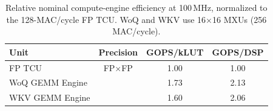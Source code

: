 \begin{table}[t]
\centering
\caption{Relative nominal compute-engine efficiency at 100\,MHz,
normalized to the 128-MAC/cycle FP TCU.
WoQ and WKV use 16$\times$16 MXUs (256 MAC/cycle).}
\label{tab:array-level}
\setlength{\tabcolsep}{3pt}
\begin{tabularx}{\columnwidth}{@{}>{\raggedright\arraybackslash}Xccc@{}}
\toprule
Unit & Precision & GOPS/kLUT & GOPS/DSP \\
\midrule
FP TCU & FP$\times$FP & 1.00 & 1.00 \\
WoQ \fpint{} GEMM Engine & \fpint{} & 1.73 & 2.13 \\
WKV \fpint{} GEMM Engine & \fpint{} & 1.60 & 2.06 \\
\bottomrule
\end{tabularx}
\end{table}
